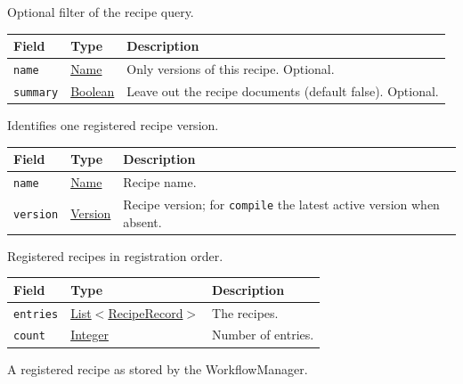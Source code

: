 \documentclass[a4paper]{arrowhead}
\newcommand{\mref}[1]{{\textcolor{ArrowheadPurple}{\hyperref[sec:model:#1]{#1}}}}
\newcommand{\pref}[1]{{\textcolor{ArrowheadGrey}{\hyperref[sec:model:primitives:#1]{#1}}}}
\begin{document}
Optional filter of the recipe query.

{\small
\begin{longtable}{|p{3.9cm}|p{4.4cm}|p{7.5cm}|}

\hline
\rowcolor{gray!33} Field & Type & Description \\ \hline
\endhead
\texttt{name} & \pref{Name} & Only versions of this recipe. Optional. \\ \hline
\texttt{summary} & \pref{Boolean} & Leave out the recipe documents (default false). Optional. \\ \hline
\end{longtable}
}

Identifies one registered recipe version.

{\small
\begin{longtable}{|p{3.9cm}|p{4.4cm}|p{7.5cm}|}

\hline
\rowcolor{gray!33} Field & Type & Description \\ \hline
\endhead
\texttt{name} & \pref{Name} & Recipe name. \\ \hline
\texttt{version} & \pref{Version} & Recipe version; for \texttt{compile} the latest active version when absent. \\ \hline
\end{longtable}
}

Registered recipes in registration order.

{\small
\begin{longtable}{|p{3.9cm}|p{4.4cm}|p{7.5cm}|}

\hline
\rowcolor{gray!33} Field & Type & Description \\ \hline
\endhead
\texttt{entries} & \pref{List}$<$\mref{RecipeRecord}$>$ & The recipes. \\ \hline
\texttt{count} & \pref{Integer} & Number of entries. \\ \hline
\end{longtable}
}

A registered recipe as stored by the WorkflowManager.
\end{document}
